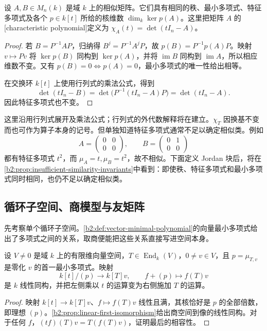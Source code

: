 \begin{proposition}\label{b2:prop:similarity-invariants}
	设 \(A,B\in M_n(k)\) 是域 \(k\) 上的相似矩阵。它们具有相同的秩、最小多项式、特征多项式及各个 \(p\in k[t]\) 所给的核维数 \(\dim_k\ker p(A)\)。这里把矩阵 \(A\) 的[characteristic polynomial]定义为 \(\chi_A(t)=\det(tI_n-A)\)。
\end{proposition}
\begin{proof}
	若 \(B=P^{-1}AP\)，归纳得 \(B^j=P^{-1}A^jP\)，故 \(p(B)=P^{-1}p(A)P\)。映射 \(v\mapsto Pv\) 将 \(\ker p(B)\) 同构到 \(\ker p(A)\)，并将 \(\operatorname{im}B\) 同构到 \(\operatorname{im}A\)，所以相应维数不变。又有 \(p(B)=0\iff p(A)=0\)，最小多项式的唯一性给出相等。

	在交换环 \(k[t]\) 上使用行列式的乘法公式，得到
	\[
		\det(tI_n-B)=\det\bigl(P^{-1}(tI_n-A)P\bigr)=\det(tI_n-A).
	\]
	因此特征多项式也不变。
\end{proof}

这里沿用行列式展开及乘法公式；行列式的外代数解释将在建立。\(\chi_T\) 因换基不变而也可作为算子本身的记号。但单独知道特征多项式通常不足以确定相似类。例如
\[
	A=\begin{pmatrix}0&0\\0&0\end{pmatrix},\qquad
	B=\begin{pmatrix}0&1\\0&0\end{pmatrix}
\]
都有特征多项式 \(t^2\)，而 \(\mu_A=t,\mu_B=t^2\)，故不相似。下面定义 Jordan 块后，将在\cref{b2:prop:insufficient-similarity-invariants}中看到：即使秩、特征多项式和最小多项式同时相同，也仍不足以确定相似类。

\subsection{循环子空间、商模型与友矩阵}
\label{b2:subsec:0104:02}

先考察单个循环子空间。\cref{b2:def:vector-minimal-polynomial}的向量最小多项式给出了多项式之间的关系，取商便能把这些关系直接写进空间本身。

\begin{proposition}\label{b2:prop:cyclic-polynomial-quotient}
	设 \(V\ne0\) 是域 \(k\) 上的有限维向量空间，\(T\in\operatorname{End}_k(V)\)，\(0\ne v\in V\)，且 \(p=\mu_{T,v}\) 是零化 \(v\) 的首一最小多项式。映射
	\[
		k[t]/(p)\longrightarrow k[T]v,\qquad f+(p)\longmapsto f(T)v
	\]
	是 \(k\) 线性同构，并把左侧乘以 \(t\) 的运算变为右侧施加 \(T\) 的运算。
\end{proposition}
\begin{proof}
	映射 \(k[t]\to k[T]v\)、\(f\mapsto f(T)v\) 线性且满，其核恰好是 \(p\) 的全部倍数，即理想 \((p)\)。\cref{b2:prop:linear-first-isomorphism}给出商空间到像的线性同构。对于任何 \(f\)，\((tf)(T)v=T(f(T)v)\)，证明最后的相容性。
\end{proof}

